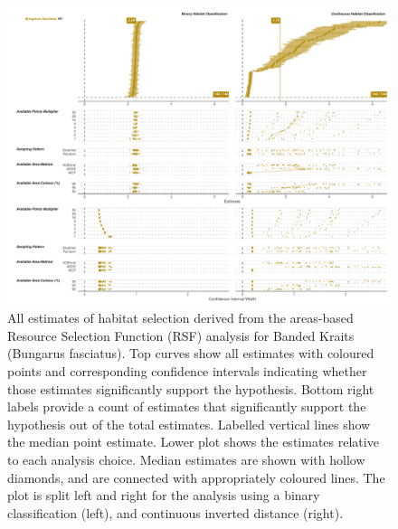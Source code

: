 \documentclass[10pt,a4paper]{article}
\begin{document}
\begin{figure}
\includegraphics[width=1\linewidth]{../../figures/specCurve_Bungarus fasciatus_rsf} \caption{All estimates of habitat selection derived from the areas-based Resource Selection Function (RSF) analysis for Banded Kraits (Bungarus fasciatus). Top curves show all estimates with coloured points and corresponding confidence intervals indicating whether those estimates significantly support the hypothesis. Bottom right labels provide a count of estimates that significantly support the hypothesis out of the total estimates. Labelled vertical lines show the median point estimate. Lower plot shows the estimates relative to each analysis choice. Median estimates are shown with hollow diamonds, and are connected with appropriately coloured lines. The plot is split left and right for the analysis using a binary classification (left), and continuous inverted distance (right).}\label{fig:specCurveRsfBUFA}
\end{figure}
\end{document}
